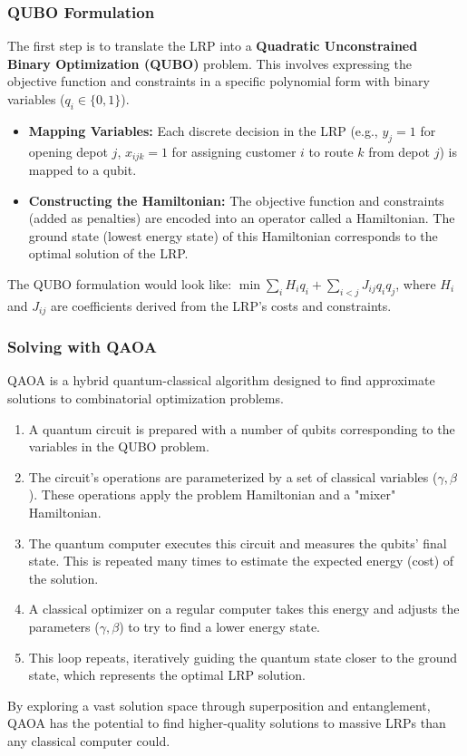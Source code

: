 \documentclass{article}
\begin{document}
\subsubsection{QUBO Formulation}
The first step is to translate the LRP into a \textbf{Quadratic Unconstrained Binary Optimization (QUBO)} problem. This involves expressing the objective function and constraints in a specific polynomial form with binary variables ($q_i \in \{0, 1\}$).
\begin{itemize}
    \item \textbf{Mapping Variables:} Each discrete decision in the LRP (e.g., $y_j=1$ for opening depot $j$, $x_{ijk}=1$ for assigning customer $i$ to route $k$ from depot $j$) is mapped to a qubit.
    \item \textbf{Constructing the Hamiltonian:} The objective function and constraints (added as penalties) are encoded into an operator called a Hamiltonian. The ground state (lowest energy state) of this Hamiltonian corresponds to the optimal solution of the LRP.
\end{itemize}
The QUBO formulation would look like:
$\min \sum_{i} H_i q_i + \sum_{i<j} J_{ij} q_i q_j$, where $H_i$ and $J_{ij}$ are coefficients derived from the LRP's costs and constraints.

\subsubsection{Solving with QAOA}
QAOA is a hybrid quantum-classical algorithm designed to find approximate solutions to combinatorial optimization problems.
\begin{enumerate}
    \item A quantum circuit is prepared with a number of qubits corresponding to the variables in the QUBO problem.
    \item The circuit's operations are parameterized by a set of classical variables ($\gamma, \beta$). These operations apply the problem Hamiltonian and a "mixer" Hamiltonian.
    \item The quantum computer executes this circuit and measures the qubits' final state. This is repeated many times to estimate the expected energy (cost) of the solution.
    \item A classical optimizer on a regular computer takes this energy and adjusts the parameters ($\gamma, \beta$) to try to find a lower energy state.
    \item This loop repeats, iteratively guiding the quantum state closer to the ground state, which represents the optimal LRP solution.
\end{enumerate}
By exploring a vast solution space through superposition and entanglement, QAOA has the potential to find higher-quality solutions to massive LRPs than any classical computer could.
\end{document}
